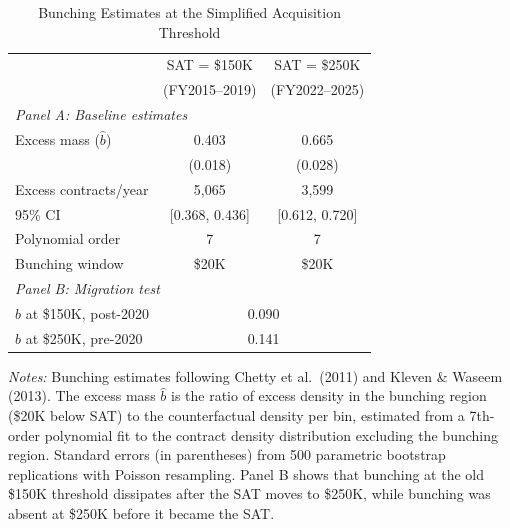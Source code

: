 \begin{table}[t]
\centering
\caption{Bunching Estimates at the Simplified Acquisition Threshold}
\label{tab:bunching}
\begin{threeparttable}
\begin{tabular}{lcc}
\toprule
 & \multicolumn{1}{c}{SAT = \$150K} & \multicolumn{1}{c}{SAT = \$250K} \\
 & \multicolumn{1}{c}{(FY2015--2019)} & \multicolumn{1}{c}{(FY2022--2025)} \\
\midrule
\multicolumn{3}{l}{\textit{Panel A: Baseline estimates}} \\
Excess mass ($\hat{b}$) & 0.403 & 0.665 \\
 & (0.018) & (0.028) \\
Excess contracts/year & 5,065 & 3,599 \\
95\% CI & [0.368, 0.436] & [0.612, 0.720] \\
Polynomial order & 7 & 7 \\
Bunching window & \$20K & \$20K \\
\midrule
\multicolumn{3}{l}{\textit{Panel B: Migration test}} \\
$\hat{b}$ at \$150K, post-2020 & \multicolumn{2}{c}{0.090} \\
$\hat{b}$ at \$250K, pre-2020 & \multicolumn{2}{c}{0.141} \\
\bottomrule
\end{tabular}
\begin{tablenotes}[flushleft]\small
\item \textit{Notes:} Bunching estimates following Chetty et al.\ (2011) and Kleven \& Waseem (2013). The excess mass $\hat{b}$ is the ratio of excess density in the bunching region (\$20K below SAT) to the counterfactual density per bin, estimated from a 7th-order polynomial fit to the contract density distribution excluding the bunching region. Standard errors (in parentheses) from 500 parametric bootstrap replications with Poisson resampling. Panel B shows that bunching at the old \$150K threshold dissipates after the SAT moves to \$250K, while bunching was absent at \$250K before it became the SAT.
\end{tablenotes}
\end{threeparttable}
\end{table}

